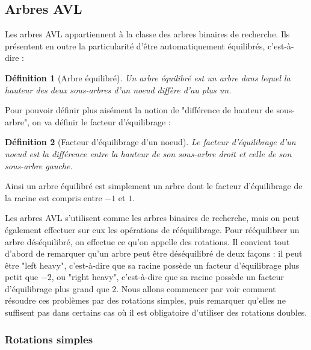 \documentclass{article}
\newtheorem*{ddef}{Définition}
\begin{document}



\subsection{Arbres AVL}
Les arbres AVL appartiennent à la classe des arbres binaires de recherche. Ils présentent en outre la particularité d'être automatiquement équilibrés, c'est-à-dire :

\begin{ddef}[Arbre équilibré]
Un arbre équilibré est un arbre dans lequel la hauteur des deux sous-arbres d'un noeud diffère d'au plus un.
\end{ddef}

Pour pouvoir définir plus aisément la notion de "différence de hauteur de sous-arbre", on va définir le facteur d'équilibrage :

\begin{ddef}[Facteur d'équilibrage d'un noeud]
Le facteur d'équilibrage d'un noeud est la différence entre la hauteur de son sous-arbre droit et celle de son sous-arbre gauche.
\end{ddef}

Ainsi un arbre équilibré est simplement un arbre dont le facteur d'équilibrage de la racine est compris entre $-1$ et $1$.

Les arbres AVL s'utilisent comme les arbres binaires de recherche, mais on peut également effectuer sur eux les opérations de rééquilibrage. Pour rééquilibrer un arbre déséquilibré, on effectue ce qu'on appelle des rotations. Il convient tout d'abord de remarquer qu'un arbre peut être déséquilibré de deux façons : il peut être "left heavy", c'est-à-dire que sa racine possède un facteur d'équilibrage plus petit que $-2$, ou "right heavy", c'est-à-dire que sa racine possède un facteur d'équilibrage plus grand que $2$. Nous allons commencer par voir comment résoudre ces problèmes par des rotations simples, puis remarquer qu'elles ne suffisent pas dans certains cas où il est obligatoire d'utiliser des rotations doubles.

\subsubsection{Rotations simples}
\end{document}
